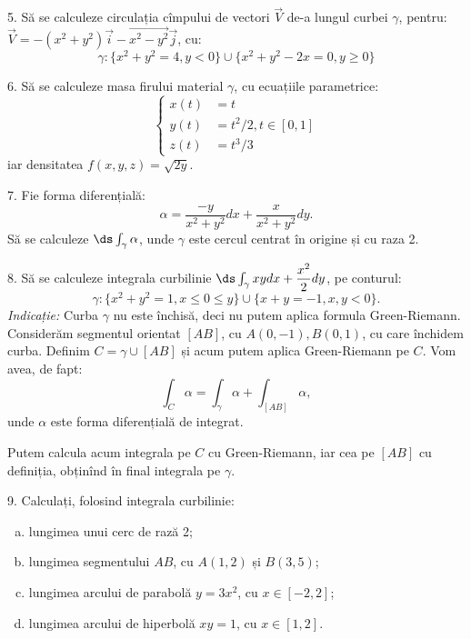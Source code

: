 \vspace{0.3cm}

5. Să se calculeze circulația cîmpului de vectori $ \vec{V} $ de-a lungul curbei
$ \gamma $, pentru:
$ \vec{V} = -(x^2 + y^2) \vec{i} - \vec{x^2 - y^2} \vec{j} $, cu:
\[
  \gamma: \{ x^2 + y^2 = 4, y < 0 \} \cup \{ x^2 + y^2 - 2x = 0, y \geq 0 \}
\]

\vspace{0.3cm}

6. Să se calculeze masa firului material $ \gamma $, cu ecuațiile parametrice:
\[
  \begin{cases}
    x(t) &= t \\
    y(t) &= t^2/2, t \in [0, 1] \\
    z(t) &= t^3/3
  \end{cases}
\]
iar densitatea $ f(x, y, z) = \sqrt{2y} $.

\vspace{0.3cm}

7. Fie forma diferențială:
\[
  \alpha = \dfrac{-y}{x^2 + y^2} dx + \dfrac{x}{x^2 + y^2} dy.
\]
Să se calculeze $ \ds\int_\gamma \alpha $, unde $ \gamma $ este cercul centrat
în origine și cu raza 2.

\vspace{0.3cm}

8. Să se calculeze integrala curbilinie $ \ds\int_\gamma xydx + \dfrac{x^2}{2} dy $,
pe conturul:
\[
  \gamma : \{ x^2 + y^2 = 1, x \leq 0 \leq y \} \cup \{ x + y = -1, x, y < 0 \}.
\]
\emph{Indicație:} Curba $ \gamma $ nu este închisă, deci nu putem aplica
formula Green-Riemann. Considerăm segmentul orientat $ [AB] $, cu
$ A(0, -1), B(0, 1) $, cu care închidem curba. Definim $ C = \gamma \cup [AB] $
și acum putem aplica Green-Riemann pe $ C $. Vom avea, de fapt:
\[
  \int_C \alpha = \int_\gamma \alpha + \int_{[AB]} \alpha,
\]
unde $ \alpha $ este forma diferențială de integrat.

Putem calcula acum integrala pe $ C $ cu Green-Riemann, iar cea pe $ [AB] $ cu
definiția, obținînd în final integrala pe $ \gamma $.

\vspace{0.3cm}

9. Calculați, folosind integrala curbilinie:
\begin{enumerate}[(a)]
\item lungimea unui cerc de rază 2;
\item lungimea segmentului $ AB $, cu $ A(1, 2) $ și $ B(3, 5) $;
\item lungimea arcului de parabolă $ y = 3x^2 $, cu $ x \in [-2, 2] $;
\item lungimea arcului de hiperbolă $ xy = 1 $, cu $ x \in [1, 2] $.
\end{enumerate}

